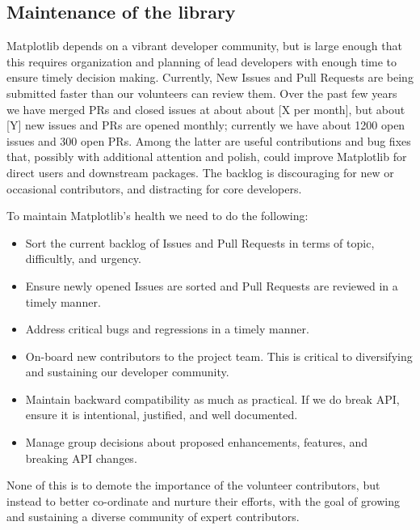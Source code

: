 \documentclass[11pt]{article}  %
\begin{document}
\subsection{Maintenance of the library}


Matplotlib depends on a vibrant developer community, but is large enough that this requires organization and planning of lead developers with enough time to ensure timely decision making.  Currently, New Issues and Pull Requests are being submitted faster than our
volunteers can review them. 
Over the past few years we have merged PRs and closed
issues at about about [X per month], but about [Y] new issues and PRs
are opened monthly; currently we have about 1200 open issues and
300 open PRs.
Among the latter are useful contributions and bug fixes
that, possibly with additional attention and polish, could improve
Matplotlib for direct users and downstream packages.
The backlog is
discouraging for new or occasional contributors, and distracting for
core developers.

To maintain Matplotlib's health we need to do the following:

\begin{itemize}[noitemsep]
\item Sort the current backlog of Issues and Pull Requests
  in terms of topic, difficultly, and urgency.
\item Ensure newly opened Issues are sorted and Pull Requests
  are reviewed in a timely manner.
\item Address critical bugs and regressions in a timely manner.
\item On-board new contributors to the project team.  This is
  critical to diversifying and sustaining our developer community.
\item Maintain backward compatibility as much as practical.  If we do
  break API, ensure it is intentional, justified, and well documented.
\item Manage group decisions about proposed enhancements, features, and
  breaking API changes.
\end{itemize}

None of this is to demote the importance of the volunteer
contributors, but instead to better co-ordinate and nurture their
efforts, with the goal of growing and sustaining a diverse community
of expert contributors.
\end{document}
